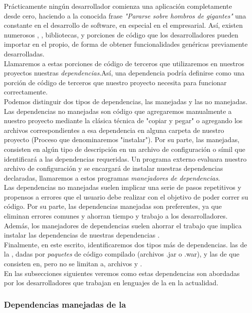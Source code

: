 Prácticamente ningún desarrollador comienza una aplicación completamente desde
cero, haciendo a la conocida frase \emph{"Pararse sobre hombros de gigantes"} una
constante en el desarrollo de software, en especial en el empresarial. Así, existen
numerosos \frameworks, \toolkits, bibliotecas, y porciones de código que los
desarrolladores pueden importar en el propio, de forma de obtener funcionalidades
genéricas previamente desarrolladas.\\
Llamaremos a estas porciones de código de terceros que utilizaremos en nuestros
proyectos nuestras \emph{dependencias}.Así, una dependencia podría definirse como
una porción de código de terceros que nuestro proyecto necesita para funcionar
correctamente.\\
Podemos distinguir dos tipos de dependencias, las manejadas y las no manejadas.
Las dependencias no manejadas son código que agregaremos manualmente a nuestro
proyecto mediante la clásica técnica de "copiar y pegar" o agregando los archivos
correspondientes a esa dependencia en alguna carpeta de nuestro proyecto (Proceso que
denominaremos "instalar"). Por su parte, las manejadas, consisten en algún tipo de
descripción en un archivo de configuración o símil que identificará a las dependencias
requeridas. Un programa externo evaluara nuestro archivo de configuración y se encargará
de instalar nuestras dependencias declaradas, llamaremos a estos programas
\emph{manejadores de dependencias}.\\
Las dependencias no manejadas suelen implicar una serie de pasos repetitivos y propensos
a errores que el usuario debe realizar con el objetivo de poder correr su código. Por su
parte, las dependencias manejadas son preferentes, ya que eliminan errores comunes y
ahorran tiempo y trabajo a los desarrolladores. Además, los manejadores de dependencias
suelen ahorrar el trabajo que implica instalar las dependencias de nuestras
dependencias .\\
Finalmente, en este escrito, identificaremos dos tipos más de dependencias. las de la
\logictier, dadas por \emph{paquetes} de código \java compilado (archivos .jar o .war),
y las de \viewtier que consisten en, pero no se limitan a, archivos \css y \js.\\
En las subsecciones siguientes veremos como estas dependencias son abordadas por los
desarrolladores que trabajan en lenguajes de la \jvm en la actualidad.

\subsubsection{Dependencias manejadas de la \logictier}
\label{susubbsec:intro:jvm_dev:logic_dependencies}

